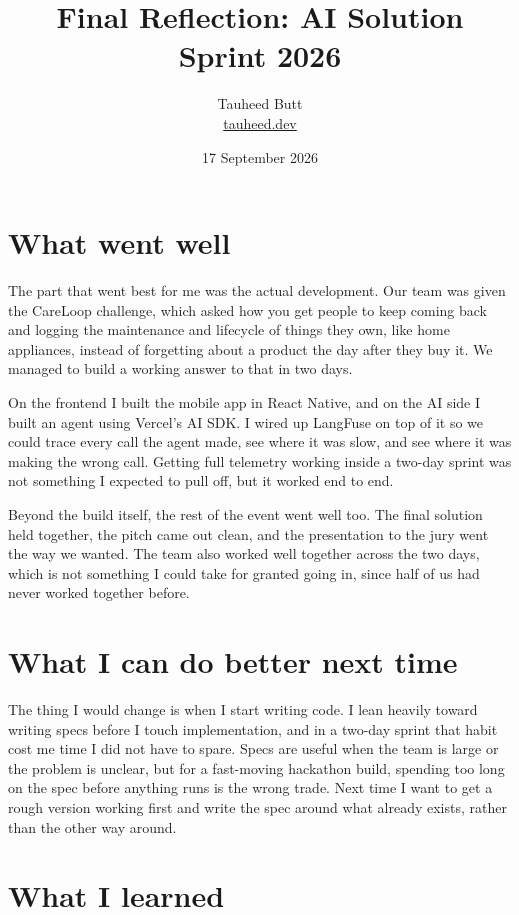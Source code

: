 \documentclass[11pt,a4paper]{article}
\title{\vspace{-1.4cm}Final Reflection: AI Solution Sprint 2026}
\author{Tauheed Butt \\ \small \href{https://tauheed.dev}{tauheed.dev}}
\date{17 September 2026}
\begin{document}
\maketitle

\section*{What went well}

The part that went best for me was the actual development. Our team was given
the CareLoop challenge, which asked how you get people to keep coming back and
logging the maintenance and lifecycle of things they own, like home appliances,
instead of forgetting about a product the day after they buy it. We managed to
build a working answer to that in two days.

On the frontend I built the mobile app in React Native, and on the AI side I
built an agent using Vercel's AI SDK. I wired up LangFuse on top of it so we
could trace every call the agent made, see where it was slow, and see where it
was making the wrong call. Getting full telemetry working inside a two-day
sprint was not something I expected to pull off, but it worked end to end.

Beyond the build itself, the rest of the event went well too. The final
solution held together, the pitch came out clean, and the presentation to the
jury went the way we wanted. The team also worked well together across the two
days, which is not something I could take for granted going in, since half of
us had never worked together before.

\section*{What I can do better next time}

The thing I would change is when I start writing code. I lean heavily toward
writing specs before I touch implementation, and in a two-day sprint that habit
cost me time I did not have to spare. Specs are useful when the team is large
or the problem is unclear, but for a fast-moving hackathon build, spending too
long on the spec before anything runs is the wrong trade. Next time I want to
get a rough version working first and write the spec around what already
exists, rather than the other way around.

\section*{What I learned}
\end{document}

